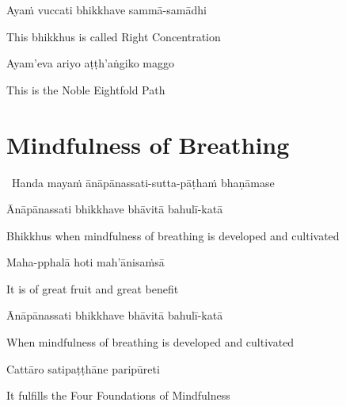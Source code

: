 Ayaṁ vuccati bhikkhave sammā-samādhi

\begin{english}
  This bhikkhus is called Right Concentration
\end{english}

Ayam'eva ariyo aṭṭh'aṅgiko maggo

\begin{english}
  This is the Noble Eightfold Path
\end{english}

\suttaRef{[DN 22]}

\ifdigital{}\fi



\section{Mindfulness of Breathing}
\label{mindfulness-of-breathing}

\begin{leader}
  \anglebracketleft\ \hspace{-0.5mm}Handa mayaṁ ānāpānassati-sutta-pāṭhaṁ bhaṇāmase \hspace{-0.5mm}\anglebracketright\
\end{leader}

Ānāpānassati bhikkhave bhāvitā bahulī-katā

\begin{english-hang}
  Bhikkhus when mindfulness of breathing is developed and cultivated
\end{english-hang}

Maha-pphalā hoti mah'ānisaṁsā

\begin{english}
  It is of great fruit and great benefit
\end{english}

Ānāpānassati bhikkhave bhāvitā bahulī-katā

\begin{english-hang}
  When mindfulness of breathing is developed and cultivated
\end{english-hang}

Cattāro satipaṭṭhāne paripūreti

\begin{english}
  It fulfills the Four Foundations of Mindfulness
\end{english}

